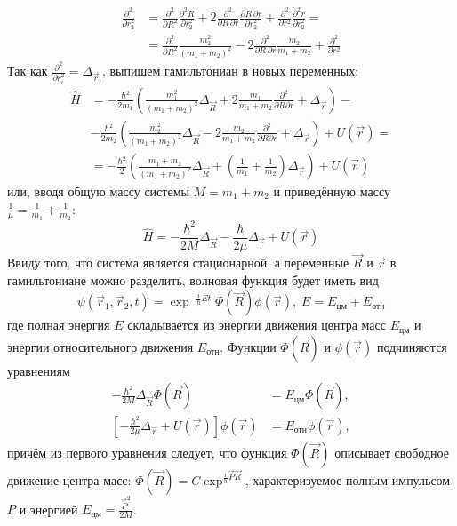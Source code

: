 \begin{align*}
    \frac{\partial^2}{\partial r_2^2} &= \frac{\partial^2}{\partial R^2} \frac{\partial^2 R}{\partial r_2^2} + 2\frac{\partial^2}{\partial R\,\partial r}\frac{\partial R\,\partial r}{\partial r_2^2} + \frac{\partial^2}{\partial r^2} \frac{\partial^2 r}{\partial r_2^2} = \\
    & = \frac{\partial^2}{\partial R^2} \frac{m_2^2}{(m_1 + m_2)^2} - 2\frac{\partial^2} {\partial R\,\partial r} \frac{m_2}{m_1 + m_2} + \frac{\partial^2}{\partial r^2}
\end{align*}
Так как $\frac{\partial^2}{\partial r_i^2} = \Delta_{\Vec{r}_i}$, выпишем гамильтониан в новых переменных:
\begin{align*}
    \hat{H} &= -\frac{\hbar^2}{2m_1}\left(\frac{m_1^2}{(m_1 + m_2)^2}\Delta_{\Vec{R}} + 2\frac{m_1}{m_1 + m_2}\frac{\partial^2}{\partial R \partial r} + \Delta_{\Vec{r}}\right) - \\
    & -\frac{\hbar^2}{2m_2}\left(\frac{m_2^2}{(m_1 + m_2)^2} \Delta_{\Vec{R}} - 2\frac{m_2}{m_1 + m_2} \frac{\partial^2}{\partial R \partial r} + \Delta_{\Vec{r}}\right) + U(\Vec{r}) = \\
    & = -\frac{\hbar^2}{2}\left(\frac{m_1 + m_2}{(m_1 + m_2)^2}\Delta_{\Vec{R}} + \left(\frac{1}{m_1} + \frac{1}{m_2}\right)\Delta_{\Vec{r}}\right) + U(\Vec{r})
\end{align*}
или, вводя общую массу системы $M = m_1 + m_2$ и приведённую массу $\frac{1}{\mu} = \frac{1}{m_1} + \frac{1}{m_2}$:
\[
\hat{H} = -\frac{\hbar^2}{2M}\Delta_{\Vec{R}} - \frac{\hbar}{2\mu}\Delta_{\Vec{r}} + U(\Vec{r})
\]
Ввиду того, что система является стационарной, а переменные $\Vec{R}$ и $\Vec{r}$ в гамильтониане можно разделить, волновая функция будет иметь вид
\[
\psi(\Vec{r}_1, \Vec{r}_2, t) = \exp^{-\frac{i}{\hbar}Et}\Phi(\Vec{R})\phi(\Vec{r}), \; E = E_{\text{цм}} + E_{\text{отн}}
\]
где полная энергия $E$ складывается из энергии движения центра масс $E_{\text{цм}}$ и энергии относительного движения $E_{\text{отн}}$. Функции $\Phi(\Vec{R})$ и $\phi(\Vec{r})$ подчиняются уравнениям
\begin{align*}
    -\frac{\hbar^2}{2M}\Delta_{\Vec{R}}\Phi(\Vec{R}) &= E_{\text{цм}}\Phi(\Vec{R}), \\
    \left[-\frac{\hbar^2}{2\mu}\Delta_{\Vec{r}} + U(\Vec{r})\right]\phi(\Vec{r}) &= E_{\text{отн}}\phi(\Vec{r}),
\end{align*}
причём из первого уравнения следует, что функция $\Phi(\Vec{R})$ описывает свободное движение центра масс: $\Phi(\Vec{R}) = C\exp^{\frac{i}{h}\Vec{P}\Vec{R}}$, характеризуемое полным импульсом $P$ и энергией $E_{\text{цм}} = \frac{\Vec{P}^2}{2M}$.

